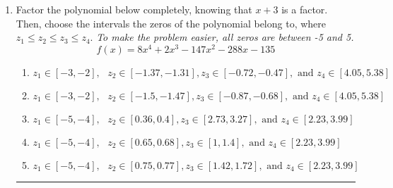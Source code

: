 \documentclass[14pt]{extbook}
\newcommand{\litem}[1]{\item#1\hspace*{-1cm}\rule{\textwidth}{0.4pt}}
\begin{document}
\begin{enumerate}
{\begin{enumerate}[label=\Alph*.]
\end{enumerate} }
\litem{
Factor the polynomial below completely, knowing that $x+3$ is a factor. Then, choose the intervals the zeros of the polynomial belong to, where $z_1 \leq z_2 \leq z_3 \leq z_4$. \textit{To make the problem easier, all zeros are between -5 and 5.}\[ f(x) = 8x^{4} +2 x^{3} -147 x^{2} -288 x -135 \]\begin{enumerate}[label=\Alph*.]
\item \( z_1 \in [-3, -2], \text{   }  z_2 \in [-1.37, -1.31], z_3 \in [-0.72, -0.47], \text{   and   } z_4 \in [4.05, 5.38] \)
\item \( z_1 \in [-3, -2], \text{   }  z_2 \in [-1.5, -1.47], z_3 \in [-0.87, -0.68], \text{   and   } z_4 \in [4.05, 5.38] \)
\item \( z_1 \in [-5, -4], \text{   }  z_2 \in [0.36, 0.4], z_3 \in [2.73, 3.27], \text{   and   } z_4 \in [2.23, 3.99] \)
\item \( z_1 \in [-5, -4], \text{   }  z_2 \in [0.65, 0.68], z_3 \in [1, 1.4], \text{   and   } z_4 \in [2.23, 3.99] \)
\item \( z_1 \in [-5, -4], \text{   }  z_2 \in [0.75, 0.77], z_3 \in [1.42, 1.72], \text{   and   } z_4 \in [2.23, 3.99] \)

\end{enumerate} }
\end{enumerate}
\end{document}
